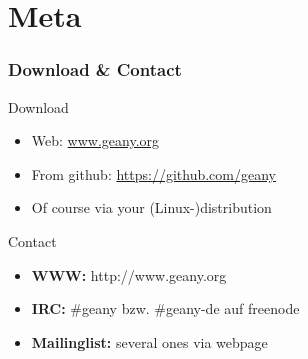 \documentclass[compress]{beamer}
\begin{document}
	\section{Meta}
	\begin{frame}
		\frametitle{Download \& Contact}
		\begin{block}{Download}
			\begin{itemize}
				\item Web: \url{www.geany.org}
				\item From github: \url{https://github.com/geany}
				\item Of course via your (Linux-)distribution
			\end{itemize}
		\end{block}
		\begin{block}{Contact}
			\begin{itemize}
				\item \textbf{WWW:} http://www.geany.org
				\item \textbf{IRC:} \#geany bzw. \#geany-de auf freenode
				\item \textbf{Mailinglist:} several ones via webpage
			\end{itemize}
		\end{block}
	\end{frame}
\end{document}
